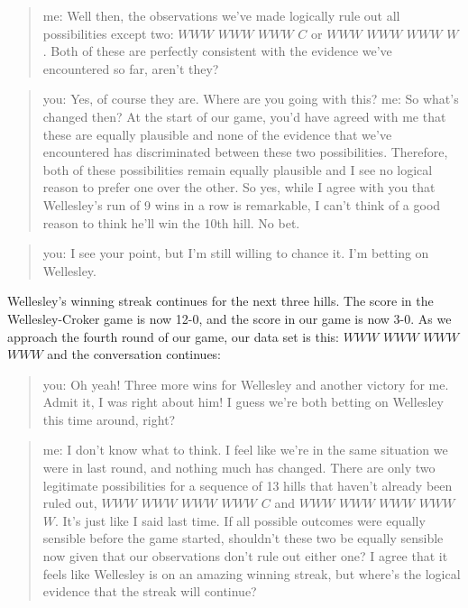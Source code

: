 \documentclass[
  letterpaper,
]{book}
\begin{document}
\begin{quote}
me: Well then, the observations we've made logically rule out all
possibilities except two: \(WWW\) \(WWW\) \(WWW\) \(C\) or \(WWW\)
\(WWW\) \(WWW\) \(W\). Both of these are perfectly consistent with the
evidence we've encountered so far, aren't they?
\end{quote}

\begin{quote}
you: Yes, of course they are. Where are you going with this? me: So
what's changed then? At the start of our game, you'd have agreed with me
that these are equally plausible and none of the evidence that we've
encountered has discriminated between these two possibilities.
Therefore, both of these possibilities remain equally plausible and I
see no logical reason to prefer one over the other. So yes, while I
agree with you that Wellesley's run of 9 wins in a row is remarkable, I
can't think of a good reason to think he'll win the 10th hill. No bet.
\end{quote}

\begin{quote}
you: I see your point, but I'm still willing to chance it. I'm betting
on Wellesley.
\end{quote}

Wellesley's winning streak continues for the next three hills. The score
in the Wellesley-Croker game is now 12-0, and the score in our game is
now 3-0. As we approach the fourth round of our game, our data set is
this: \(WWW\) \(WWW\) \(WWW\) \(WWW\) and the conversation continues:

\begin{quote}
you: Oh yeah! Three more wins for Wellesley and another victory for me.
Admit it, I was right about him! I guess we're both betting on Wellesley
this time around, right?
\end{quote}

\begin{quote}
me: I don't know what to think. I feel like we're in the same situation
we were in last round, and nothing much has changed. There are only two
legitimate possibilities for a sequence of 13 hills that haven't already
been ruled out, \(WWW\) \(WWW\) \(WWW\) \(WWW\) \(C\) and \(WWW\)
\(WWW\) \(WWW\) \(WWW\) \(W\). It's just like I said last time. If all
possible outcomes were equally sensible before the game started,
shouldn't these two be equally sensible now given that our observations
don't rule out either one? I agree that it feels like Wellesley is on an
amazing winning streak, but where's the logical evidence that the streak
will continue?
\end{quote}
\end{document}
